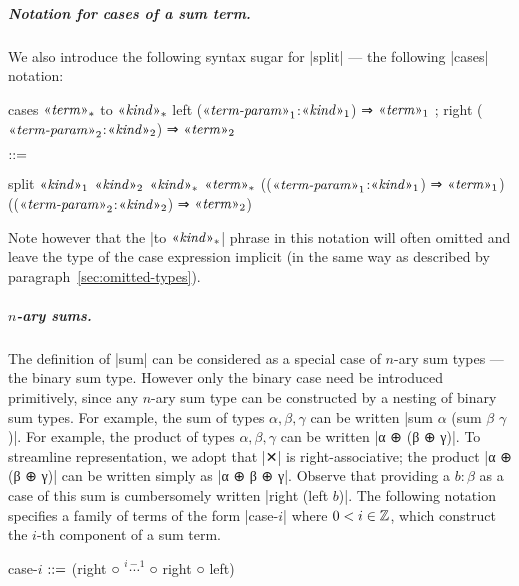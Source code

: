 \newpage
\subparagraph{Notation for cases of a sum term.}
We also introduce the following syntax sugar for \code|split| --- the following \code|cases| notation:
\begin{notational}[caption={Notation for \code|case|.}]
cases $\mvar{term}_*$ to $\mvar{kind}_*$
  { left ($\mvar{term-param}_1$:$\mvar{kind}_1$) ⇒ $\mvar{term}_1$
  ; right ($\mvar{term-param}_2$:$\mvar{kind}_2$) ⇒ $\mvar{term}_2$ }

$\syneq$

split $\mvar{kind}_1$ $\mvar{kind}_2$ $\mvar{kind}_*$
  $\mvar{term}_*$
  (($\mvar{term-param}_1$:$\mvar{kind}_1$) ⇒ $\mvar{term}_1$)
  (($\mvar{term-param}_2$:$\mvar{kind}_2$) ⇒ $\mvar{term}_2$)
\end{notational}
Note however that the \code|to $\mvar{kind}_*$| phrase in this notation will often omitted and leave the type of the case expression implicit (in the same way as described by paragraph~\ref{sec:omitted-types}).

\subparagraph{$n$-ary sums.}
The definition of \code|sum| can be considered as a special case of $n$-ary sum types --- the binary sum type.
However only the binary case need be introduced primitively, since any $n$-ary sum type can be constructed by a nesting of binary sum types.
For example, the sum of types $α, β, γ$ can be written \code|sum $α$ (sum $β$ $γ$)|.
For example, the product of types $α, β, γ$ can be written \code|α ⊕ (β ⊕ γ)|.
To streamline representation, we adopt that \code|✕| is right-associative; the product \code|α ⊕ (β ⊕ γ)| can be written simply as \code|α ⊕ β ⊕ γ|.
Observe that providing a $b:β$ as a case of this sum is cumbersomely written \code|right (left $b$)|.
The following notation specifies a family of terms of the form \code|case-$i$| where $0 < i \in \Z$, which construct the $i$-th component of a sum term.
\begin{notational}
case-$i$   $\syneq$   (right ○ $\stackrel{i-1}{\cdots}$ ○ right ○ left)
\end{notational}

